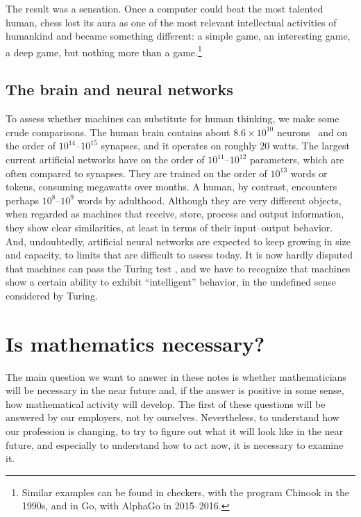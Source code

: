 \documentclass[12pt]{article}
\begin{document}
The result was a sensation. Once a computer could beat the most
talented human, chess lost its aura as one of the most relevant
intellectual activities of humankind and became something different:
a simple game, an interesting game, a deep
game, but nothing more than a game.\footnote{
Similar examples can be found in checkers, with the program Chinook in the 1990s,
and in Go, with AlphaGo in 2015--2016.}


\subsection{The brain and neural networks}\label{sec:brain}

To assess whether machines can substitute for human thinking,
we make some crude comparisons.
The human brain contains about $8.6\times 10^{10}$
neurons~\cite{Azevedo2009} and on the order of $10^{14}$--$10^{15}$
synapses, and it operates on roughly $20$ watts.
The largest current artificial networks have on the order of $10^{11}$--$10^{12}$ parameters,
which are often compared to synapses.
They are trained on the order of
$10^{13}$ words or tokens, consuming megawatts over months. A human, by
contrast, encounters perhaps $10^{8}$--$10^{9}$ words by adulthood.
%
Although they are very different objects, when regarded as machines
that receive, store, process and output information, they show clear
similarities, at least in terms of their input--output behavior.
%
And, undoubtedly, artificial neural networks are expected to keep growing
in size and capacity, to limits that are difficult to assess today.
It is now hardly disputed that machines can pass the Turing test \cite{wiki2}, and we have to recognize that
machines show a certain ability to exhibit ``intelligent'' behavior, in the undefined sense considered by Turing.



\section{Is mathematics necessary?}


The main question we want to answer in these notes is whether mathematicians will be necessary in the near future
and, if the answer is positive in some sense, how mathematical activity will develop.
The first of these questions will be answered by our employers,
not by ourselves.
%
Nevertheless, to understand how our profession is changing, to try to figure out
what it will look like in the near future,
and especially to understand how to act now, it is necessary to examine it.
\end{document}
